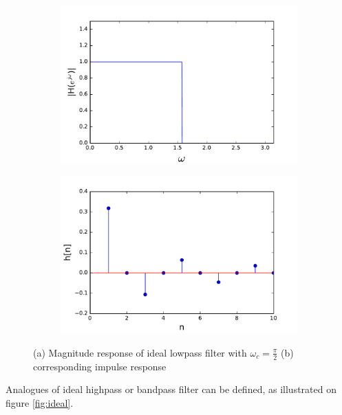 \begin{figure}[H]
\begin{subfigure}[b]{0.50\textwidth}
        \centering
\includegraphics[scale=0.45]{figures/filter_teori/ideal_low2.pdf}
\caption{}
\end{subfigure}
\begin{subfigure}[b]{0.50\textwidth}
        \centering  
\includegraphics[scale=0.45]{figures/filter_teori/ideal_low1.pdf}
\caption{}
 \end{subfigure}
\caption{ (a) Magnitude response of ideal lowpass filter with $\omega_c = \frac{\pi}{2}$ (b) corresponding impulse response}
\label{fig:ideal_low}
\end{figure}


Analogues of ideal highpass or bandpass filter can be defined, as illustrated on figure \ref{fig:ideal}.\\ 

